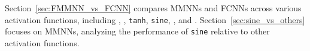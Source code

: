 \documentclass[11pt,a4paper]{article}
\begin{document}
Section~\ref{sec:FMMNN_vs_FCNN} compares MMNNs and FCNNs across various activation functions, including \ReLU, \GELU, \texttt{tanh}, \texttt{sine}, \cosine, and . Section~\ref{sec:sine_vs_others} focuses on MMNNs, analyzing the performance of \texttt{sine} relative to other activation functions. 





\end{document}
